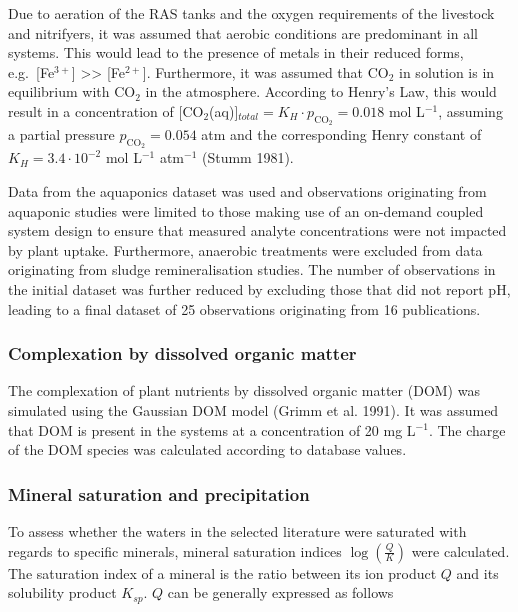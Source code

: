 \documentclass[
]{article}
\begin{document}
Due to aeration of the RAS tanks and the oxygen requirements of the livestock and nitrifyers, it was assumed that aerobic conditions are predominant in all systems. This would lead to the presence of metals in their reduced forms, e.g.~{[}Fe\(^{3+}\){]} \textgreater\textgreater{} {[}Fe\(^{2+}\){]}. Furthermore, it was assumed that CO\(_{2}\) in solution is in equilibrium with CO\(_{2}\) in the atmosphere. According to Henry's Law, this would result in a concentration of {[}CO\(_{2}\)(aq){]}\(_{total} = K_{H} \cdot p_{\text{CO}_{2}} = 0.018\) mol L\(^{-1}\), assuming a partial pressure \(p_{\text{CO}_{2}} = 0.054\) atm and the corresponding Henry constant of \(K_{H} = 3.4 \cdot 10^{-2}\) mol L\(^{-1}\) atm\(^{-1}\) (Stumm 1981).

Data from the aquaponics dataset was used and observations originating from aquaponic studies were limited to those making use of an on-demand coupled system design to ensure that measured analyte concentrations were not impacted by plant uptake. Furthermore, anaerobic treatments were excluded from data originating from sludge remineralisation studies. The number of observations in the initial dataset was further reduced by excluding those that did not report pH, leading to a final dataset of 25 observations originating from 16 publications.

\hypertarget{complexation-by-dissolved-organic-matter}{%
\subsubsection{Complexation by dissolved organic matter}\label{complexation-by-dissolved-organic-matter}}

The complexation of plant nutrients by dissolved organic matter (DOM) was simulated using the Gaussian DOM model (Grimm et al. 1991). It was assumed that DOM is present in the systems at a concentration of 20 mg L\(^{-1}\). The charge of the DOM species was calculated according to database values.

\hypertarget{mineral-saturation-and-precipitation}{%
\subsubsection{Mineral saturation and precipitation}\label{mineral-saturation-and-precipitation}}

To assess whether the waters in the selected literature were saturated with regards to specific minerals, mineral saturation indices \(\log(\frac{Q}{K})\) were calculated. The saturation index of a mineral is the ratio between its ion product \(Q\) and its solubility product \(K_{sp}\). \(Q\) can be generally expressed as follows
\end{document}
